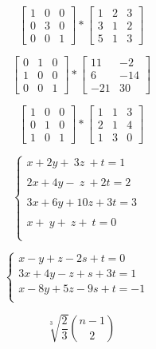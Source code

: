 \documentclass[12pt]{article}
\begin{document}
$$
\left[ \begin{array}{ccc}
1 & 0 & 0 \\
0 & 3 & 0 \\
0 & 0 & 1
\end{array} \right]
*
\left[ \begin{array}{ccc}
1 & 2 & 3 \\
3 & 1 & 2 \\
5 & 1 & 3
\end{array} \right]
$$

$$
\left[ \begin{array}{ccc}
0 & 1 & 0 \\
1 & 0 & 0 \\
0 & 0 & 1
\end{array} \right]
*
\left[ \begin{array}{ccc}
11 & -2  \\
6 & -14 \\
-21 & 30
\end{array} \right]
$$

$$
\left[ \begin{array}{ccc}
1 & 0 & 0 \\
0 & 1 & 0 \\
1 & 0 & 1
\end{array} \right]
*
\left[ \begin{array}{ccc}
1 & 1 & 3 \\
2 & 1 & 4 \\
1 & 3 & 0
\end{array} \right]
$$

$$
\left\{ \begin{array}{ll}
x+2y+\ 3z\ +t = 1\\ & \\
2x+4y-\ z\ +2t = 2\\ & \\
3x+6y+10z+3t = 3\\ & \\
x+\ y+\ z+\ t = 0\\ & \\
\end{array} \right.
$$

$$
\left\{ \begin{array}{ll}
x-y+z-2s+t =0 & \\
3x+4y-z+s+3t = 1 & \\
x-8y+5z-9s+t = -1& \\
\end{array} \right.
$$

$$
\sqrt[3]{\frac{2}{3}}
{n-1 \choose 2} 
$$
\end{document}
